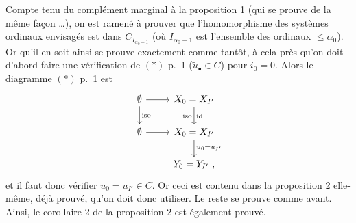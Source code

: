 Compte tenu du complément marginal à la proposition 1 (qui se prouve de la même façon \ldots), on est ramené à prouver que l'homomorphisme des systèmes ordinaux envisagés est dans $C_{I_{\alpha_0+1}}$ (où $I_{\alpha_0+1}$ est l'ensemble des ordinaux $\leq \alpha_0$). Or qu'il en soit ainsi se prouve exactement comme tantôt, à cela près qu'on doit d'abord faire une vérification de $(*)$ p.~1 ($\tilde{u}_\bullet \in C$) pour $i_0 = 0$. Alors le diagramme $(*)$ p.~1 est
\[
\begin{tikzcd}
\emptyset \arrow[r] \arrow[d, "\mathrm{iso}"] & X_0 = X_{I'} \arrow[d, "\mathrm{iso}"', "\mathrm{id}"] \\
\emptyset \arrow[r] & X_0 = X_{I'} \arrow[d, "u_0 = u_{I'}"] \\
 & Y_0 = Y_{I'}\ ,
\end{tikzcd}
\]
et il faut donc vérifier $u_0 = u_{I'} \in C$. Or ceci est contenu dans la proposition 2 elle-même, déjà prouvé, qu'on doit donc utiliser. %
Le reste se prouve comme avant. Ainsi, le corollaire 2 de la proposition 2 est également prouvé.

